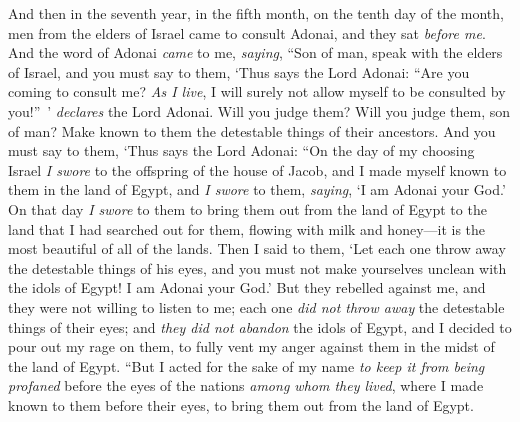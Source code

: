 \begin{biblechapter} %
 And then in the seventh year, in the fifth month, on the tenth day of the month, men from the elders of Israel came to consult Adonai, and they sat \textit{before me}.
\verse And the word of Adonai \textit{came} to me, \textit{saying},
\verse “Son of man, speak with the elders of Israel, and you must say to them, ‘Thus says the Lord Adonai: “Are you coming to consult me? \textit{As I live}, I will surely not allow myself to be consulted by you!” ’ \textit{declares} the Lord Adonai.
\verse Will you judge them? Will you judge them, son of man? Make known to them the detestable things of their ancestors.
\verse And you must say to them, ‘Thus says the Lord Adonai: “On the day of my choosing Israel \textit{I swore} to the offspring of the house of Jacob, and I made myself known to them in the land of Egypt, and \textit{I swore} to them, \textit{saying}, ‘I am Adonai your God.’
\verse On that day \textit{I swore} to them to bring them out from the land of Egypt to the land that I had searched out for them, flowing with milk and honey—it is the most beautiful of all of the lands.
\verse Then I said to them, ‘Let each one throw away the detestable things of his eyes, and you must not make yourselves unclean with the idols of Egypt! I am Adonai your God.’
\verse But they rebelled against me, and they were not willing to listen to me; each one \textit{did not throw away} the detestable things of their eyes; and \textit{they did not abandon} the idols of Egypt, and I decided to pour out my rage on them, to fully vent my anger against them in the midst of the land of Egypt.
\verse “But I acted for the sake of my name \textit{to keep it from being profaned} before the eyes of the nations \textit{among whom they lived}, where I made known to them before their eyes, to bring them out from the land of Egypt.

\end{biblechapter}

